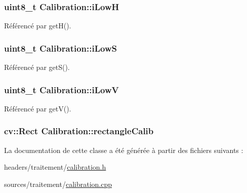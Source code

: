 \hypertarget{classCalibration_a1d7d84d44fc3abbf136ce9dc964aa02a}{
\subsubsection[{i\-Low\-H}]{\setlength{\rightskip}{0pt plus 5cm}uint8\-\_\-t Calibration\-::i\-Low\-H\hspace{0.3cm}{\ttfamily [private]}}}\label{classCalibration_a1d7d84d44fc3abbf136ce9dc964aa02a}


Référencé par get\-H().

\hypertarget{classCalibration_a258a3e9be8b3269a3e1e921da88e5b5a}{
\subsubsection[{i\-Low\-S}]{\setlength{\rightskip}{0pt plus 5cm}uint8\-\_\-t Calibration\-::i\-Low\-S\hspace{0.3cm}{\ttfamily [private]}}}\label{classCalibration_a258a3e9be8b3269a3e1e921da88e5b5a}


Référencé par get\-S().

\hypertarget{classCalibration_a852abbbb791c1625252d3d23825e7648}{
\subsubsection[{i\-Low\-V}]{\setlength{\rightskip}{0pt plus 5cm}uint8\-\_\-t Calibration\-::i\-Low\-V\hspace{0.3cm}{\ttfamily [private]}}}\label{classCalibration_a852abbbb791c1625252d3d23825e7648}


Référencé par get\-V().

\hypertarget{classCalibration_aa3fc415d57199effd80858c330ba5caa}{
\subsubsection[{rectangle\-Calib}]{\setlength{\rightskip}{0pt plus 5cm}cv\-::\-Rect Calibration\-::rectangle\-Calib\hspace{0.3cm}{\ttfamily [private]}}}\label{classCalibration_aa3fc415d57199effd80858c330ba5caa}


La documentation de cette classe a été générée à partir des fichiers suivants \-:\begin{DoxyCompactItemize}
\item 
headers/traitement/\hyperlink{calibration_8h}{calibration.\-h}\item 
sources/traitement/\hyperlink{calibration_8cpp}{calibration.\-cpp}\end{DoxyCompactItemize}
